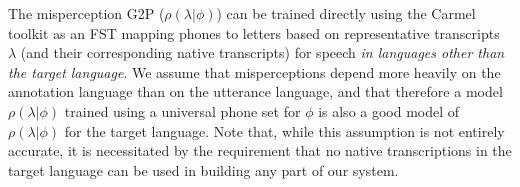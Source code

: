 The misperception G2P ($\rho(\lambda|\phi)$) can be trained directly
using the Carmel toolkit \cite{Knight99} as an FST mapping phones to
letters based on representative transcripts $\lambda$ (and their
corresponding native transcripts) for speech {\em in languages other
  than the target language}. We assume that misperceptions depend more
heavily on the annotation language than on the utterance language, and
that therefore a model $\rho(\lambda|\phi)$ trained using a universal
phone set for $\phi$ is also a good model of $\rho(\lambda|\phi)$ for
the target language. Note that, while this assumption is not entirely
accurate, it is necessitated by the requirement that no native
transcriptions in the target language can be used in building any part
of our system.

